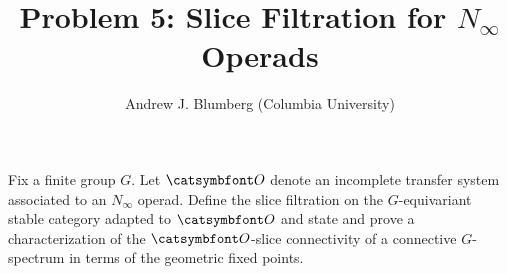 

\title{Problem 5: Slice Filtration for $N_\infty$ Operads}
\author{Andrew J. Blumberg (Columbia University)}
\date{}


\maketitle

Fix a finite group $G$.  Let $\aO$ denote an incomplete transfer system associated to an $N_\infty$ operad.  Define the slice filtration on the $G$-equivariant stable category adapted to $\aO$ and state and prove a characterization of the $\aO$-slice connectivity of a connective $G$-spectrum in terms of the geometric fixed points.


